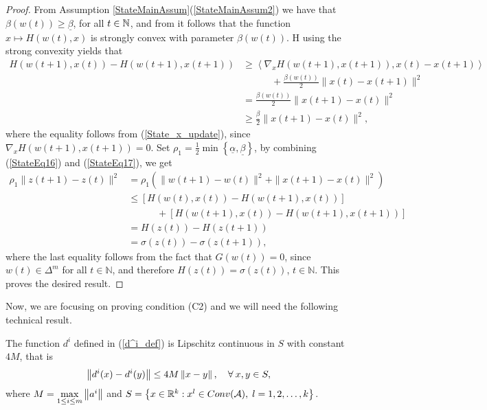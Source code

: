 \begin{proof}
From Assumption \ref{StateMainAssum}(\ref{StateMainAssum2}) we have that $\beta(w(t)) \geq \underline{\beta}$, for all $t \in \mathbb{N}$, and from  it follows that the function $x \mapsto H(w(t),x)$ is strongly convex with parameter $\beta(w(t))$. H using the strong convexity yields that
\begin{align}
	H(w(t+1),x(t))  - H(w(t+1),x(t+1)) &\geq \left\langle \nabla_x H(w(t+1),x(t+1)) , x(t)-x(t+1) \right\rangle \nonumber \\
	&\quad\quad\quad + \frac{\beta(w(t))}{2} \|x(t) - x(t+1)\|^2 \nonumber \\
	& = \frac{\beta(w(t))}{2} \|x(t+1) - x(t)\|^2  \nonumber \\
	& \geq \frac{\underline{\beta}}{2} \|x(t+1) - x(t)\|^2 , \label{StateEq17}
\end{align}
where the equality follows from (\ref{State_x_update}), since $\nabla_{x} H(w(t+1), x(t+1)) = 0$.
Set $\rho_1 = \frac{1}{2}\min\left\lbrace \underline{\alpha} , \underline{\beta} \right\rbrace$, by combining (\ref{StateEq16}) and (\ref{StateEq17}), we get
\begin{align*}
	\rho_1 \|z(t+1)- z(t)\|^2 
	&= \rho_1 \left( \|w(t+1) - w(t)\|^2 + \|x(t+1) - x(t)\|^2  \right) \\
	&\leq \left[ H(w(t),x(t)) - H(w(t+1),x(t)) \right] \\
	&\quad\quad\quad + \left[ H(w(t+1),x(t)) - H(w(t+1),x(t+1)) \right] \\
	&= H(z(t)) - H(z(t+1)) \\
	&= \sigma(z(t)) - \sigma(z(t+1)),
\end{align*}
where the last equality follows from the fact that $G(w(t)) = 0$, since $w(t) \in \Delta^m$ for all $t \in \mathbb{N}$, and therefore $H(z(t))=\sigma(z(t))$, $t \in \mathbb{N}$. This proves the desired result.
\end{proof}

Now, we are focusing on proving condition (C2) and we will need the following technical result.

\begin{lemma} \label{StateEq11}
The function $d^i$ defined in (\ref{d^i_def}) is Lipschitz continuous in $S$ with constant $4M$, that is
\begin{equation*}
	\left\Vert {d^i(x) - d^i(y)} \right\Vert \leq 4M \left\Vert {x - y} \right\Vert, \quad \forall \: x,y \in S,
\end{equation*}
where $M = \max\limits_{1 \leq i \leq m} \left\Vert {a^i} \right\Vert$ and  $S=\left\lbrace x \in \mathbb{R}^k : x^l \in Conv(\mathcal{A}), \; l=1,2,\ldots,k \right\rbrace$.
\end{lemma}

